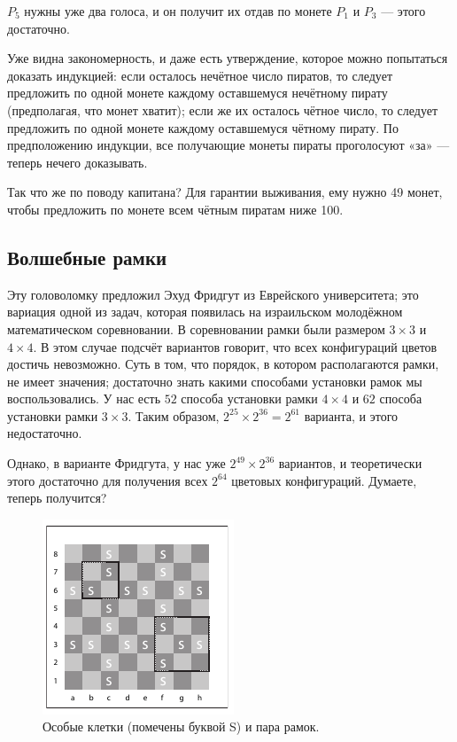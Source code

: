 $P_5$ нужны уже два голоса, и он получит их отдав по монете $P_1$ и $P_3$ --- этого достаточно.

Уже видна закономерность, и даже есть утверждение, которое можно попытаться доказать индукцией:
если осталось нечётное число пиратов, то следует предложить по одной монете каждому оставшемуся нечётному пирату (предполагая, что монет хватит);
если же их осталось чётное число, то следует предложить по одной монете каждому оставшемуся чётному пирату.
По предположению индукции, все получающие монеты пираты проголосуют «за» --- теперь нечего доказывать.

Так что же по поводу капитана?
Для гарантии выживания, ему нужно 49 монет, чтобы предложить по монете всем чётным пиратам ниже 100.

\subsection*{Волшебные рамки}

Эту головоломку предложил Эхуд Фридгут из Еврейского университета; это вариация одной из задач, которая появилась на израильском молодёжном математическом соревновании.
В соревновании рамки были размером $3 \times 3$ и $4 \times 4$.
В этом случае подсчёт вариантов говорит, что всех конфигураций цветов достичь невозможно.
Суть в том, что порядок, в котором располагаются рамки, не имеет значения;
достаточно знать какими способами установки рамок мы воспользовались.
У нас есть $52$ способа установки рамки $4 \times 4$
и $62$ способа установки рамки $3 \times 3$.
Таким образом, $2^{25} \times 2^{36} = 2^{61}$ варианта, и этого недостаточно.

Однако, в варианте Фридгута, у нас уже $2^{49} \times 2^{36}$ вариантов, и теоретически этого достаточно для получения всех $2^{64}$ цветовых конфигураций.
Думаете, теперь получится?

\begin{figure}[t!]
\centering
\includegraphics[scale=1]{pics/chess}
\caption{Особые клетки (помечены буквой S) и пара рамок.}
\label{pic:chess1}
\end{figure}

